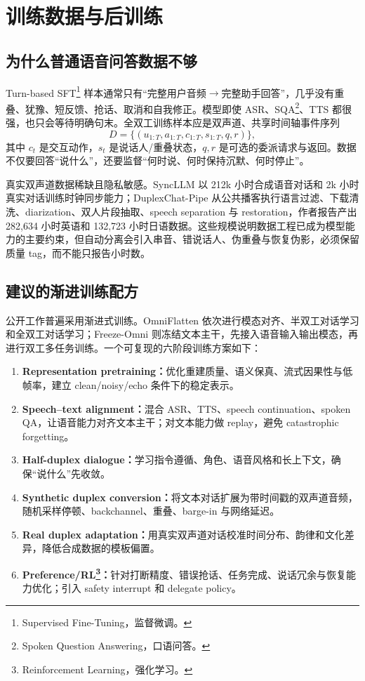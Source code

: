 \section{训练数据与后训练}

\subsection{为什么普通语音问答数据不够}

Turn-based SFT\footnote{Supervised Fine-Tuning，监督微调。} 样本通常只有“完整用户音频$\to$完整助手回答”，几乎没有重叠、犹豫、短反馈、抢话、取消和自我修正。模型即使 ASR、SQA\footnote{Spoken Question Answering，口语问答。}、TTS 都很强，也只会等待明确句末。全双工训练样本应是双声道、共享时间轴事件序列
\begin{equation}
D=\{(u_{1:T},a_{1:T},c_{1:T},s_{1:T},q,r)\},
\end{equation}
其中 $c_t$ 是交互动作，$s_t$ 是说话人/重叠状态，$q,r$ 是可选的委派请求与返回。数据不仅要回答“说什么”，还要监督“何时说、何时保持沉默、何时停止”。

真实双声道数据稀缺且隐私敏感。SyncLLM 以 212k 小时合成语音对话和 2k 小时真实对话训练时钟同步能力\cite{veluri2024syncllm}；DuplexChat-Pipe 从公共播客执行语言过滤、下载清洗、diarization、双人片段抽取、speech separation 与 restoration，作者报告产出 282,634 小时英语和 132,723 小时日语数据\cite{nakata2026duplexchat}。这些规模说明数据工程已成为模型能力的主要约束，但自动分离会引入串音、错说话人、伪重叠与恢复伪影，必须保留质量 tag，而不能只报告小时数。

\subsection{建议的渐进训练配方}

公开工作普遍采用渐进式训练。OmniFlatten 依次进行模态对齐、半双工对话学习和全双工对话学习\cite{zhang2024omniflatten}；Freeze-Omni 则冻结文本主干，先接入语音输入输出模态，再进行双工多任务训练\cite{wang2024freezeomni}。一个可复现的六阶段训练方案如下：

\begin{enumerate}
  \item \textbf{Representation pretraining：}优化重建质量、语义保真、流式因果性与低帧率，建立 clean/noisy/echo 条件下的稳定表示。
  \item \textbf{Speech--text alignment：}混合 ASR、TTS、speech continuation、spoken QA，让语音能力对齐文本主干；对文本能力做 replay，避免 catastrophic forgetting。
  \item \textbf{Half-duplex dialogue：}学习指令遵循、角色、语音风格和长上下文，确保“说什么”先收敛。
  \item \textbf{Synthetic duplex conversion：}将文本对话扩展为带时间戳的双声道音频，随机采样停顿、backchannel、重叠、barge-in 与网络延迟。
  \item \textbf{Real duplex adaptation：}用真实双声道对话校准时间分布、韵律和文化差异，降低合成数据的模板偏置。
  \item \textbf{Preference/RL\footnote{Reinforcement Learning，强化学习。}：}针对打断精度、错误抢话、任务完成、说话冗余与恢复能力优化；引入 safety interrupt 和 delegate policy。
\end{enumerate}

